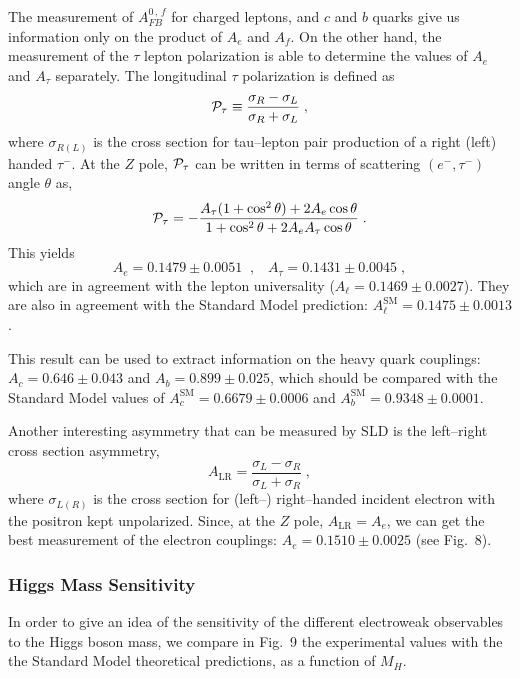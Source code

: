 \documentclass[12pt]{report}
\def\text#1{{\scriptstyle\mathrm{#1}}}
\begin{document}
The measurement of $A_{FB}^{0\, , \, f}$ for charged leptons, and
$c$ and $b$ quarks give us information only on the product of
$A_e$ and $A_f$. On the other hand, the measurement of the $\tau$
lepton polarization is able to determine the values of $A_e$ and
$A_\tau$ separately. The longitudinal $\tau$ polarization is defined
as
\[
{\cal P}_\tau \equiv \frac{\sigma_R - \sigma_L}{\sigma_R + \sigma_L}
\; ,
\]
where $\sigma_{R(L)}$ is the cross section for tau--lepton pair
production of a right (left) handed $\tau^-$. At the $Z$ pole, ${\cal
P}_\tau$ can be written in terms of scattering $(e^-,\tau^-)$ angle
$\theta$ as,
\[
{\cal P}_\tau = - \frac{A_\tau (1 +\cos^2\theta) + 2 A_e \cos\theta}
               {1 + \cos^2\theta + 2 A_e A_\tau\cos\theta} \; .
\]
This yields \cite{Lep:99}
\[
A_e = 0.1479 \pm 0.0051 \;\; , \;\;\; A_\tau = 0.1431 \pm 0.0045 \; ,
\]
which are in agreement with the lepton universality ($A_\ell = 0.1469
\pm 0.0027$). They are also in agreement with the Standard Model
prediction: $A_\ell^{\text{SM}} = 0.1475 \pm 0.0013$. 

This result can be used to extract information on the heavy quark
couplings: $A_c = 0.646 \pm 0.043$ and $A_b = 0.899 \pm 0.025$, which
should be compared with the  Standard Model values of 
$A_c^{\text{SM}} = 0.6679 \pm 0.0006$ and $A_b^{\text{SM}} = 0.9348
\pm 0.0001$.

Another interesting asymmetry that can be measured by SLD is the
left--right cross section asymmetry,
\begin{equation}
A_{\text{LR}} = \frac{\sigma_L - \sigma_R}{\sigma_L + \sigma_R} \; ,
\label{alr}
\end{equation}
where $\sigma_{L(R)}$ is the cross section for (left--) right--handed
incident electron with the positron kept unpolarized.  Since, at the
$Z$ pole, $A_{\text{LR}} = A_e$, we can get the best measurement of the
electron couplings: $A_e = 0.1510 \pm 0.0025$ (see Fig.\ 8).  


\subsubsection{Higgs Mass Sensitivity} \indent

In order to give an idea of the sensitivity of the different
electroweak observables to the Higgs boson mass, we compare in Fig.\
9 the experimental values with the the Standard Model theoretical
predictions, as a function of $M_H$.
\end{document}

